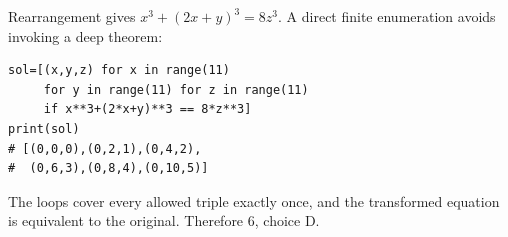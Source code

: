 Rearrangement gives $x^3+(2x+y)^3=8z^3$. A direct finite enumeration avoids invoking a deep theorem:
\begin{verbatim}
sol=[(x,y,z) for x in range(11)
     for y in range(11) for z in range(11)
     if x**3+(2*x+y)**3 == 8*z**3]
print(sol)
# [(0,0,0),(0,2,1),(0,4,2),
#  (0,6,3),(0,8,4),(0,10,5)]
\end{verbatim}
The loops cover every allowed triple exactly once, and the transformed equation is equivalent to the original. Therefore $\boxed6$, choice D.
